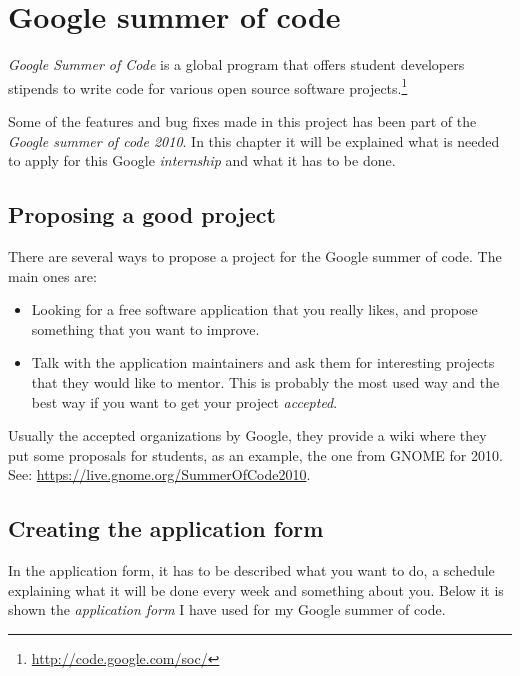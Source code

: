 
\chapter{Google summer of code}


\emph{Google Summer of Code} is a global program that offers student developers stipends to write code for various open source software projects.\footnote{\url{http://code.google.com/soc/}}

Some of the features and bug fixes made in this project has been part of the \emph{Google summer of code 2010}. In this chapter it will be explained what is needed to apply for this Google \emph{internship} and what it has to be done.


\section{Proposing a good project}\label{sec:GoodProject}

There are several ways to propose a project for the Google summer of code. The main ones are:
\begin{itemize}
  \item Looking for a free software application that you really likes, and propose something that you want to improve.
  \item Talk with the application maintainers and ask them for interesting projects that they would like to mentor. This is probably the most used way and the best way if you want to get your project \emph{accepted}.
\end{itemize}

Usually the accepted organizations by Google, they provide a wiki where they put some proposals for students, as an example, the one from GNOME for 2010. See: \url{https://live.gnome.org/SummerOfCode2010}.

\section{Creating the application form}\label{ApplicationForm}

In the application form, it has to be described what you want to do, a schedule explaining what it will be done every week and something about you. Below it is shown the \emph{application form} I have used for my Google summer of code.


